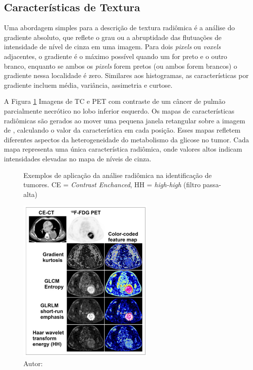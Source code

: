 \subsection{Características de Textura}

Uma abordagem simples para a descrição de textura radiômica é a análise do gradiente absoluto, que reflete o grau ou a abruptidade das flutuações de intensidade de nível de cinza em uma imagem. Para dois \textit{pixels} ou \textit{voxels} adjacentes, o gradiente é o máximo possível quando um for preto e o outro branco, enquanto se ambos os \textit{pixels} forem pretos (ou ambos forem brancos) o gradiente nessa localidade é zero. Similares aos histogramas, as características por gradiente incluem média, variância, assimetria e curtose.

A Figura \ref{fig:fig001} Imagens de \gls{TC} e \gls{PET} com contraste de um câncer de pulmão parcialmente necrótico no lobo inferior esquerdo. Os mapas de características radiômicas são gerados ao mover uma pequena janela retangular sobre a imagem de , calculando o valor da característica em cada posição. Esses mapas refletem diferentes aspectos da heterogeneidade do metabolismo da glicose no tumor. Cada mapa representa uma única característica radiômica, onde valores altos indicam intensidades elevadas no mapa de níveis de cinza.


\begin{figure}[htbp]
    \centering
    \caption{Exemplos de aplicação da análise radiômica na identificação de tumores. 
    \newline CE = \textit{Contrast Enchanced}, HH = \textit{high-high} (filtro passa-alta)}
    \includegraphics[width=0.6\textwidth]{figures/fig001.png}
    \caption*{Autor: \cite{mayerhoeferIntroductionRadiomics2020}}
    \label{fig:fig001}
\end{figure}

